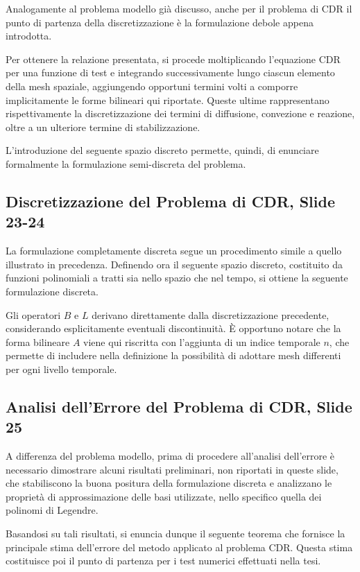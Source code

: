 \documentclass[12pt]{article}
\begin{document}
    Analogamente al problema modello già discusso, anche per il problema di CDR il punto di partenza della discretizzazione è la formulazione debole appena introdotta.

    Per ottenere la relazione presentata, si procede moltiplicando l'equazione CDR per una funzione di test e integrando successivamente lungo ciascun elemento della mesh spaziale, aggiungendo opportuni termini volti a comporre implicitamente le forme bilineari qui riportate. Queste ultime rappresentano rispettivamente la discretizzazione dei termini di diffusione, convezione e reazione, oltre a un ulteriore termine di stabilizzazione.

    L'introduzione del seguente spazio discreto permette, quindi, di enunciare formalmente la formulazione semi-discreta del problema.

    \subsection{Discretizzazione del Problema di CDR, Slide 23-24}

    La formulazione completamente discreta segue un procedimento simile a quello illustrato in precedenza. Definendo ora il seguente spazio discreto, costituito da funzioni polinomiali a tratti sia nello spazio che nel tempo, si ottiene la seguente formulazione discreta.

    Gli operatori $B$ e $L$ derivano direttamente dalla discretizzazione precedente, considerando esplicitamente eventuali discontinuità. È opportuno notare che la forma bilineare $A$ viene qui riscritta con l'aggiunta di un indice temporale $n$, che permette di includere nella definizione la possibilità di adottare mesh differenti per ogni livello temporale.

    \subsection{Analisi dell'Errore del Problema di CDR, Slide 25}

    A differenza del problema modello, prima di procedere all'analisi dell'errore è necessario dimostrare alcuni risultati preliminari, non riportati in queste slide, che stabiliscono la buona positura della formulazione discreta e analizzano le proprietà di approssimazione delle basi utilizzate, nello specifico quella dei polinomi di Legendre.

    Basandosi su tali risultati, si enuncia dunque il seguente teorema che fornisce la principale stima dell'errore del metodo applicato al problema CDR. Questa stima costituisce poi il punto di partenza per i test numerici effettuati nella tesi.
\end{document}
